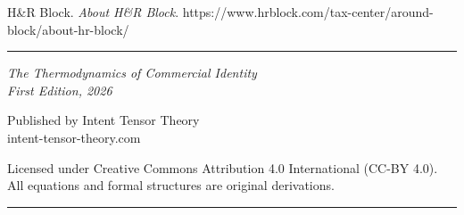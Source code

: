 \documentclass[12pt, openany]{book}
\theoremstyle{thmstyle}
\theoremstyle{defstyle}
\begin{document}
\vspace{4pt}
\noindent H\&R Block. \textit{About H\&R Block}. https://www.hrblock.com/tax-center/around-block/about-hr-block/

\newpage
\thispagestyle{empty}
\vspace*{3in}
\begin{center}
\color{navy}\rule{0.4\textwidth}{1pt}

\vspace{16pt}
{\large\color{accentgray}\itshape
The Thermodynamics of Commercial Identity\\
First Edition, 2026}

\vspace{12pt}
{\normalsize\color{accentgray}
Published by Intent Tensor Theory\\
intent-tensor-theory.com}

\vspace{12pt}
{\small\color{accentgray}
Licensed under Creative Commons Attribution 4.0 International (CC-BY 4.0).\\
All equations and formal structures are original derivations.}

\vspace{16pt}
\color{navy}\rule{0.4\textwidth}{1pt}
\end{center}
\end{document}
